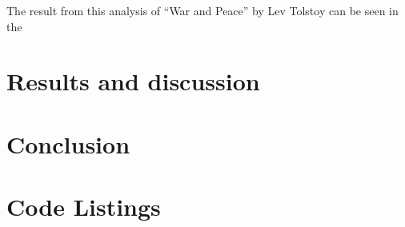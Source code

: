 \documentclass[a4paper, 11pt]{article}
\begin{document}
The result from this analysis of ``War and Peace'' by Lev Tolstoy can be
seen in the 

\section{Results and discussion}

\section{Conclusion}



\section{Code Listings}
\end{document}
